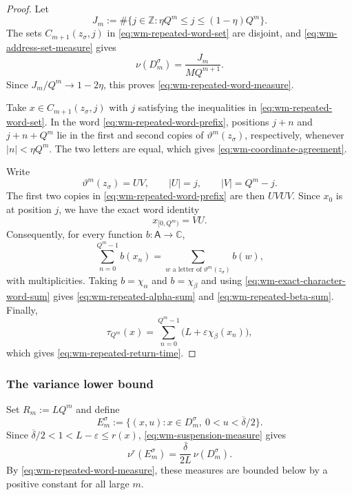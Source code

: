 \documentclass[11pt,reqno,a4paper]{amsart}
\numberwithin{equation}{section}
\theoremstyle{compact}
\theoremstyle{definition}
\theoremstyle{definition}
\begin{document}
\begin{proof}
Let
\[
  J_m:=\#\{j\in\mathbb Z:
       \eta Q^m\leq j\leq(1-\eta)Q^m\}.
\]
The sets $C_{m+1}(z_\sigma,j)$ in
\eqref{eq:wm-repeated-word-set} are disjoint, and
\eqref{eq:wm-address-set-measure} gives
\begin{equation}\label{eq:wm-repeated-word-measure-computation}
  \nu(D_m^\sigma)=\frac{J_m}{MQ^{m+1}}.
\end{equation}
Since $J_m/Q^m\to1-2\eta$, this proves
\eqref{eq:wm-repeated-word-measure}.

Take $x\in C_{m+1}(z_\sigma,j)$ with $j$ satisfying the inequalities in
\eqref{eq:wm-repeated-word-set}.  In the word
\eqref{eq:wm-repeated-word-prefix}, positions $j+n$ and
$j+n+Q^m$ lie in the first and second copies of
$\vartheta^m(z_\sigma)$, respectively, whenever
$|n|<\eta Q^m$.  The two letters are equal, which gives
\eqref{eq:wm-coordinate-agreement}.

Write
\[
  \vartheta^m(z_\sigma)=UV,
  \qquad |U|=j,
  \qquad |V|=Q^m-j.
\]
The first two copies in \eqref{eq:wm-repeated-word-prefix} are then
$UVUV$.  Since $x_0$ is at position $j$, we have the exact word identity
\[
  x_{[0,Q^m)}=VU.
\]
Consequently, for every function $b:\mathsf A\to\mathbb C$,
\[
  \sum_{n=0}^{Q^m-1}b(x_n)
  =\sum_{w\text{ a letter of }\vartheta^m(z_\sigma)}b(w),
\]
with multiplicities.  Taking $b=\chi_\alpha$ and $b=\chi_\beta$ and using
\eqref{eq:wm-exact-character-word-sum} gives
\eqref{eq:wm-repeated-alpha-sum} and
\eqref{eq:wm-repeated-beta-sum}.  Finally,
\[
  \tau_{Q^m}(x)
  =\sum_{n=0}^{Q^m-1}\bigl(L+\varepsilon\chi_\beta(x_n)\bigr),
\]
which gives \eqref{eq:wm-repeated-return-time}.
\end{proof}

\subsubsection{The variance lower bound}

Set $R_m:=LQ^m$ and define
\begin{equation}\label{eq:wm-positive-measure-suspension-set}
  E_m^\sigma
  :=\{(x,u):x\in D_m^\sigma,\ 0<u<\overline\delta/2\}.
\end{equation}
Since $\overline\delta/2<1<L-\varepsilon\leq r(x)$,
\eqref{eq:wm-suspension-measure} gives
\[
  \nu^r(E_m^\sigma)
  =\frac{\overline\delta}{2L}\,\nu(D_m^\sigma).
\]
By \eqref{eq:wm-repeated-word-measure}, these measures are bounded below by
a positive constant for all large $m$.
\end{document}
